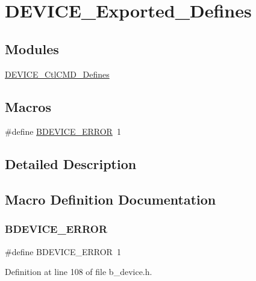 \hypertarget{group___d_e_v_i_c_e___exported___defines}{}\section{D\+E\+V\+I\+C\+E\+\_\+\+Exported\+\_\+\+Defines}
\label{group___d_e_v_i_c_e___exported___defines}
\subsection*{Modules}
\begin{DoxyCompactItemize}
\item 
\mbox{\hyperlink{group___d_e_v_i_c_e___ctl_c_m_d___defines}{D\+E\+V\+I\+C\+E\+\_\+\+Ctl\+C\+M\+D\+\_\+\+Defines}}
\end{DoxyCompactItemize}
\subsection*{Macros}
\begin{DoxyCompactItemize}
\item 
\#define \mbox{\hyperlink{group___d_e_v_i_c_e___exported___defines_ga04dfad1d8e6733a6441d2a2741e4b274}{B\+D\+E\+V\+I\+C\+E\+\_\+\+E\+R\+R\+OR}}~1
\end{DoxyCompactItemize}


\subsection{Detailed Description}


\subsection{Macro Definition Documentation}
\mbox{\label{group___d_e_v_i_c_e___exported___defines_ga04dfad1d8e6733a6441d2a2741e4b274}} 
\subsubsection{\texorpdfstring{B\+D\+E\+V\+I\+C\+E\+\_\+\+E\+R\+R\+OR}{BDEVICE\_ERROR}}
{\footnotesize\ttfamily \#define B\+D\+E\+V\+I\+C\+E\+\_\+\+E\+R\+R\+OR~1}



Definition at line 108 of file b\+\_\+device.\+h.

